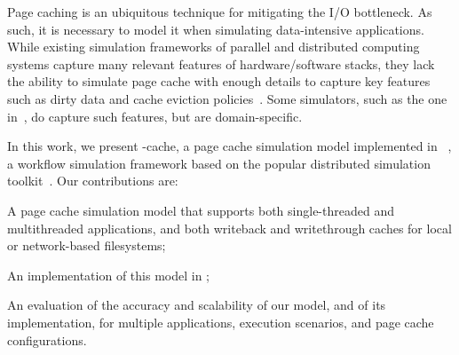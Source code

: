 Page caching is an ubiquitous technique for mitigating the I/O bottleneck.
As such, it is necessary to model it
when simulating data-intensive applications.
While existing simulation frameworks of parallel and distributed computing
systems  capture many relevant features of hardware/software stacks, 
they lack the ability to simulate page cache with enough details to capture key features such
as dirty data and cache eviction policies~\cite{nunez2012simcan,nunez2012icancloud}. 
Some simulators, such as the one in~\cite{xu2018saving}, do capture such features,
but are domain-specific. 


In this work, we present \wrench-cache, a page cache simulation model
implemented in \wrench~\cite{casanova2020fgcs}, a workflow simulation
framework based on the popular \simgrid distributed simulation
toolkit~\cite{casanova2014simgrid}. Our contributions are:

\begin{compactitem}
    \item A page cache simulation model that supports 
both single-threaded and multithreaded applications, and both
writeback and writethrough caches for local or network-based
filesystems;
    \item An implementation of this model in \wrench; 
    \item An evaluation of the accuracy and scalability of our model, and of its implementation,
          for multiple applications, execution scenarios, and page cache configurations. 
\end{compactitem}
